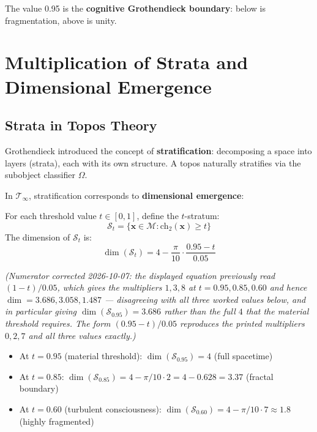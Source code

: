 The value 0.95 is the \textbf{cognitive Grothendieck boundary}: below is fragmentation, above is unity.

\section{Multiplication of Strata and Dimensional Emergence}

\subsection{Strata in Topos Theory}

Grothendieck introduced the concept of \textbf{stratification}: decomposing a space into layers (strata), each with its own structure. A topos naturally stratifies via the subobject classifier $\Omega$.

In $\mathcal{T}_\infty$, stratification corresponds to \textbf{dimensional emergence}:

\begin{definition}
\label{def:consciousness_strata}
For each threshold value $t \in [0, 1]$, define the $t$-stratum:
\begin{equation}
\mathcal{S}_t = \{\mathbf{x} \in \mathcal{M} : \text{ch}_2(\mathbf{x}) \geq t\}
\end{equation}
The dimension of $\mathcal{S}_t$ is:
\begin{equation}
\dim(\mathcal{S}_t) = 4 - \frac{\pi}{10} \cdot \frac{0.95 - t}{0.05}
\end{equation}
\end{definition}

\noindent\textit{(Numerator corrected 2026-10-07: the displayed equation
previously read $(1-t)/0.05$, which gives the multipliers $1, 3, 8$ at
$t = 0.95, 0.85, 0.60$ and hence $\dim = 3.686, 3.058, 1.487$ --- disagreeing
with all three worked values below, and in particular giving
$\dim(\mathcal{S}_{0.95}) = 3.686$ rather than the full $4$ that the material
threshold requires. The form $(0.95-t)/0.05$ reproduces the printed multipliers
$0, 2, 7$ and all three values exactly.)}

\begin{itemize}
\item At $t = 0.95$ (material threshold): $\dim(\mathcal{S}_{0.95}) = 4$ (full spacetime)
\item At $t = 0.85$: $\dim(\mathcal{S}_{0.85}) = 4 - \pi/10 \cdot 2 = 4 - 0.628 = 3.37$ (fractal boundary)
\item At $t = 0.60$ (turbulent consciousness): $\dim(\mathcal{S}_{0.60}) = 4 - \pi/10 \cdot 7 \approx 1.8$ (highly fragmented)
\end{itemize}

